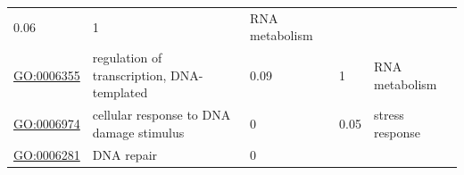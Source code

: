 \documentclass[
]{article}
\begin{document}
\begin{longtable}[]{@{}lllll@{}}
\begin{minipage}[t]{0.17\columnwidth}
0.06\strut
\end{minipage} & \begin{minipage}[t]{0.17\columnwidth}\raggedright
1\strut
\end{minipage} & \begin{minipage}[t]{0.17\columnwidth}\raggedright
RNA metabolism\strut
\end{minipage}\tabularnewline
\begin{minipage}[t]{0.17\columnwidth}\raggedright
\url{GO:0006355}\strut
\end{minipage} & \begin{minipage}[t]{0.17\columnwidth}\raggedright
regulation of transcription, DNA-templated\strut
\end{minipage} & \begin{minipage}[t]{0.17\columnwidth}\raggedright
0.09\strut
\end{minipage} & \begin{minipage}[t]{0.17\columnwidth}\raggedright
1\strut
\end{minipage} & \begin{minipage}[t]{0.17\columnwidth}\raggedright
RNA metabolism\strut
\end{minipage}\tabularnewline
\begin{minipage}[t]{0.17\columnwidth}\raggedright
\url{GO:0006974}\strut
\end{minipage} & \begin{minipage}[t]{0.17\columnwidth}\raggedright
cellular response to DNA damage stimulus\strut
\end{minipage} & \begin{minipage}[t]{0.17\columnwidth}\raggedright
0\strut
\end{minipage} & \begin{minipage}[t]{0.17\columnwidth}\raggedright
0.05\strut
\end{minipage} & \begin{minipage}[t]{0.17\columnwidth}\raggedright
stress response\strut
\end{minipage}\tabularnewline
\begin{minipage}[t]{0.17\columnwidth}\raggedright
\url{GO:0006281}\strut
\end{minipage} & \begin{minipage}[t]{0.17\columnwidth}\raggedright
DNA repair\strut
\end{minipage} & \begin{minipage}[t]{0.17\columnwidth}\raggedright
0\strut
\end{minipage} & \begin{minipage}[t]{0.17\columnwidth}\raggedright

\end{minipage}
\end{longtable}
\end{document}
